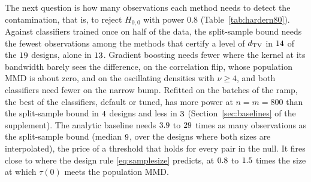 \begin{table}[t]
\centering
\footnotesize
\setlength{\tabcolsep}{5pt}

\caption{Sample size $n=m$ (mixed types: $n$, with $m=5n$) at which each method reaches power $0.8$ against
$H_{0,0}$ at $\delta=0.05$, from $\mnRepsPerSize$ replicates per size, interpolated between the two sizes that bracket
$0.8$ and rounded to two significant digits; ${\le}\mnNmin$, ${>}\mnNcap$: reached at the smallest size, not reached
at the largest. Bold: the smallest among the four tests that certify a level of $\TV$; italic: the smaller of the last
two, which test $P=Q$ only. $\widehat\alpha$: the betting test of Theorem~\ref{thm:betting} on the Laplace ramp;
$\widehat\alpha_{\mathrm{an}}$: the analytic test \eqref{eq:test} with the Gaussian kernel; GBM, logistic: the betting test on the labels of
gradient boosting and logistic regression trained once on half of the data, a handicap removed in Figure~\ref{fig:recovery}; perm.\ MMD: permutation test
with the Gaussian kernel at the pilot bandwidth of the analytic test and $\abPermB$ relabelings; MMDAgg: the test of
\citet{schrab2023aggregated}; the last two were run up to $n=800$ ($\fourdigits{\harderNtwo}$ on the narrow bump), so
${>}800$ means not reached there. The analytic and permutation tests take their bandwidth from a separate pilot draw,
not counted in $n$ (Section~\ref{sec:numharder}).}
\label{tab:hardern80}
\end{table}

The next question is how many observations each method needs to detect the contamination, that is, to reject
$H_{0,0}$ with power $0.8$ (Table~\ref{tab:hardern80}). Against classifiers trained once on half of the data, the
split-sample bound needs the fewest observations among the methods that certify a level of $\TV$ in
$14$ of the $19$ designs, alone in $13$. Gradient boosting needs fewer
where the kernel at its bandwidth barely sees the difference, on the correlation flip, whose population MMD is about
zero, and on the oscillating densities with $\nu\ge4$, and both classifiers need fewer on the narrow bump. Refitted on
the batches of the ramp, the best of the classifiers, default or tuned, has more power at $n=m=800$ than the
split-sample bound in $4$ designs and less in $3$
(Section~\ref{sec:baselines} of the supplement). The analytic baseline needs $3.9$ to $29$ times
as many observations as the split-sample bound (median $9$, over the designs where both sizes are
interpolated), the price of a threshold that holds for every pair in the null. It fires close to where the design rule
\eqref{eq:samplesize} predicts, at $0.8$ to $1.5$ times the size at which $\tau(0)$ meets
the population MMD.

